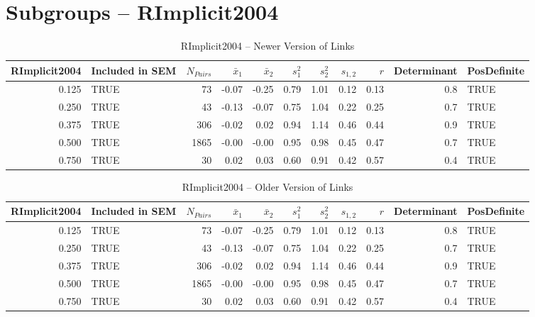 \documentclass{article}\usepackage[]{graphicx}\usepackage[]{color}
\begin{document}
\section{Subgroups --  RImplicit2004 }%
\begin{table}[ht]
\centering
\begin{tabular}{rlrrrrrrrrl}
  \hline
RImplicit2004 & Included in SEM & $N_{Pairs}$ & $\bar{x}_1$ & $\bar{x}_2$ & $s_1^2$ & $s_2^2$ & $s_{1,2}$ & $r$ & Determinant & PosDefinite \\ 
  \hline
0.125 & TRUE & 73 & -0.07 & -0.25 & 0.79 & 1.01 & 0.12 & 0.13 & 0.8 & TRUE \\ 
  0.250 & TRUE & 43 & -0.13 & -0.07 & 0.75 & 1.04 & 0.22 & 0.25 & 0.7 & TRUE \\ 
  0.375 & TRUE & 306 & -0.02 & 0.02 & 0.94 & 1.14 & 0.46 & 0.44 & 0.9 & TRUE \\ 
  0.500 & TRUE & 1865 & -0.00 & -0.00 & 0.95 & 0.98 & 0.45 & 0.47 & 0.7 & TRUE \\ 
  0.750 & TRUE & 30 & 0.02 & 0.03 & 0.60 & 0.91 & 0.42 & 0.57 & 0.4 & TRUE \\ 
   \hline
\end{tabular}
\caption{RImplicit2004 -- Newer Version of Links} 
\end{table}
\begin{table}[ht]
\centering
\begin{tabular}{rlrrrrrrrrl}
  \hline
RImplicit2004 & Included in SEM & $N_{Pairs}$ & $\bar{x}_1$ & $\bar{x}_2$ & $s_1^2$ & $s_2^2$ & $s_{1,2}$ & $r$ & Determinant & PosDefinite \\ 
  \hline
0.125 & TRUE & 73 & -0.07 & -0.25 & 0.79 & 1.01 & 0.12 & 0.13 & 0.8 & TRUE \\ 
  0.250 & TRUE & 43 & -0.13 & -0.07 & 0.75 & 1.04 & 0.22 & 0.25 & 0.7 & TRUE \\ 
  0.375 & TRUE & 306 & -0.02 & 0.02 & 0.94 & 1.14 & 0.46 & 0.44 & 0.9 & TRUE \\ 
  0.500 & TRUE & 1865 & -0.00 & -0.00 & 0.95 & 0.98 & 0.45 & 0.47 & 0.7 & TRUE \\ 
  0.750 & TRUE & 30 & 0.02 & 0.03 & 0.60 & 0.91 & 0.42 & 0.57 & 0.4 & TRUE \\ 
   \hline
\end{tabular}
\caption{RImplicit2004 -- Older Version of Links} 
\end{table}
\end{document}

